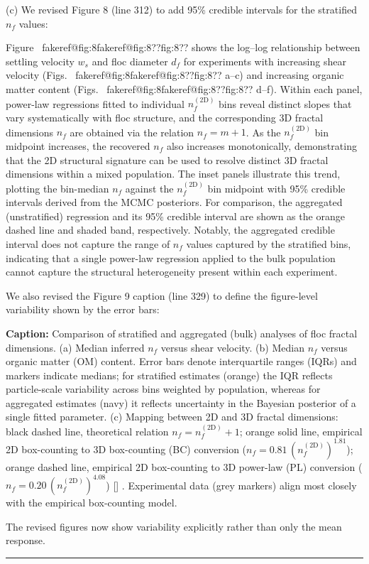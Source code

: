 \documentclass[11pt]{article}
\makeatletter
\newenvironment{Snippet}{%
  \par\vspace{0.3em}\begin{list}{}{\setlength{\leftmargin}{1em}\setlength{\rightmargin}{0.5em}}\item\small\itshape
}{%
  \end{list}\vspace{0.3em}
}
\newcommand{\fakeref}[1]{%
  \ifcsname fakeref@#1\endcsname\csname fakeref@#1\endcsname\else ??#1??\fi
}
\renewcommand{\ref}[1]{\fakeref{#1}}%
\newcommand{\citelookup}[1]{%
  \ifcsname cite@#1\endcsname\csname cite@#1\endcsname\else #1\fi
}
\newcommand{\citeformat}[1]{%
  \def\citelist{}%
  \forcsvlist{\addtocitelist}{#1}%
  \textup{[\citelist]}%
}
\newcommand{\addtocitelist}[1]{%
  \ifx\citelist\empty
    \edef\citelist{\citelookup{#1}}%
  \else
    \edef\citelist{\citelist;\space\citelookup{#1}}%
  \fi
}
\renewcommand{\cite}[1]{\citeformat{#1}}
\renewcommand{\caption}[2][]{\par\noindent\textbf{Caption:} #2\par}
\makeatother
\begin{document}
\begin{enumerate}[label=\textbf{R3.\arabic*.}]
(c) We revised Figure 8 (line 312) to add 95\% credible intervals for the stratified $n_f$ values:
\begin{Snippet}
Figure~\ref{fig:8} shows the log--log relationship between settling velocity $w_s$ and floc diameter $d_f$ for experiments with increasing shear velocity (Figs.~\ref{fig:8}a--c) and increasing organic matter content (Figs.~\ref{fig:8}d--f). Within each panel, power-law regressions fitted to individual $n_f^{(\mathrm{2D})}$ bins reveal distinct slopes that vary systematically with floc structure, and the corresponding 3D fractal dimensions $n_f$ are obtained via the relation $n_f = m + 1$. As the $n_f^{(\mathrm{2D})}$ bin midpoint increases, the recovered $n_f$ also increases monotonically, demonstrating that the 2D structural signature can be used to resolve distinct 3D fractal dimensions within a mixed population. The inset panels illustrate this trend, plotting the bin-median $n_f$ against the $n_f^{(\mathrm{2D})}$ bin midpoint with 95\% credible intervals derived from the MCMC posteriors. For comparison, the aggregated (unstratified) regression and its 95\% credible interval are shown as the orange dashed line and shaded band, respectively. Notably, the aggregated credible interval does not capture the range of $n_f$ values captured by the stratified bins, indicating that a single power-law regression applied to the bulk population cannot capture the structural heterogeneity present within each experiment.
\end{Snippet}
We also revised the Figure 9 caption (line 329) to define the figure-level variability shown by the error bars:
\begin{Snippet}
    \caption{Comparison of stratified and aggregated (bulk) analyses of floc fractal dimensions. (a) Median inferred \(n_f\) versus shear velocity. (b) Median \(n_f\) versus organic matter (OM) content. Error bars denote interquartile ranges (IQRs) and markers indicate medians; for stratified estimates (orange) the IQR reflects particle-scale variability across bins weighted by population, whereas for aggregated estimates (navy) it reflects uncertainty in the Bayesian posterior of a single fitted parameter. (c) Mapping between 2D and 3D fractal dimensions: black dashed line, theoretical relation \(n_f = n_f^{(\mathrm{2D})} + 1\); orange solid line, empirical 2D box-counting to 3D box-counting (BC) conversion ($n_f = 0.81\,(n_f^{(\mathrm{2D})})^{1.81}$); orange dashed line, empirical 2D box-counting to 3D power-law (PL) conversion ($n_f = 0.20\,(n_f^{(\mathrm{2D})})^{4.08}$) \cite{wang2022fractal}. Experimental data (grey markers) align most closely with the empirical box-counting model.}
\end{Snippet}
The revised figures now show variability explicitly rather than only the mean response.

\end{enumerate}


\hrule
\vspace{0.8em}
\end{document}
